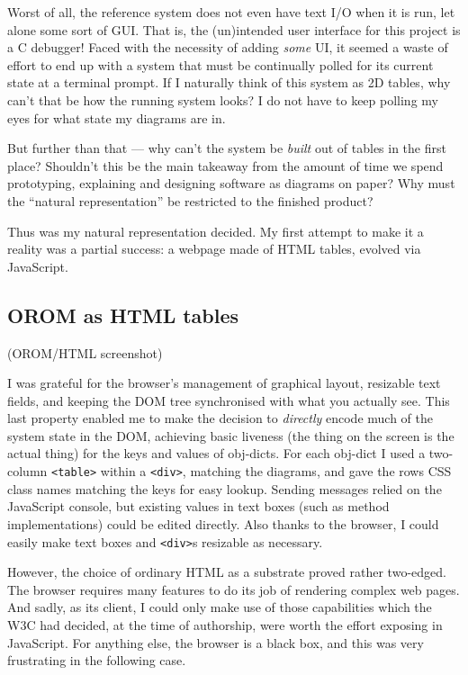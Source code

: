 \documentclass[english,submission]{programming}
\begin{document}
  Worst of all, the reference system does not even have text I/O when it
  is run, let alone some sort of GUI. That is, the (un)intended user
  interface for this project is a C debugger! Faced with the necessity of
  adding \emph{some} UI, it seemed a waste of effort to end up with a
  system that must be continually polled for its current state at a
  terminal prompt. If I naturally think of this system as 2D tables, why
  can't that be how the running system looks? I do not have to keep
  polling my eyes for what state my diagrams are in.

  But further than that --- why can't the system be \emph{built} out of
  tables in the first place? Shouldn't this be the main takeaway from the
  amount of time we spend prototyping, explaining and designing software
  as diagrams on paper? Why must the ``natural representation'' be
  restricted to the finished product?

  Thus was my natural representation decided. My first attempt to make it
  a reality was a partial success: a webpage made of HTML tables, evolved
  via JavaScript.

  \hypertarget{orom-as-html-tables}{%
  \subsection{OROM as HTML tables}\label{orom-as-html-tables}}

  (OROM/HTML screenshot)

  I was grateful for the browser's management of graphical layout,
  resizable text fields, and keeping the DOM tree synchronised with what
  you actually see. This last property enabled me to make the decision to
  \emph{directly} encode much of the system state in the DOM, achieving
  basic liveness (the thing on the screen is the actual thing) for the
  keys and values of obj-dicts. For each obj-dict I used a two-column
  \texttt{\textless{}table\textgreater{}} within a
  \texttt{\textless{}div\textgreater{}}, matching the diagrams, and gave
  the rows CSS class names matching the keys for easy lookup. Sending
  messages relied on the JavaScript console, but existing values in text
  boxes (such as method implementations) could be edited directly. Also
  thanks to the browser, I could easily make text boxes and
  \texttt{\textless{}div\textgreater{}}s resizable as necessary.

  However, the choice of ordinary HTML as a substrate proved rather
  two-edged. The browser requires many features to do its job of rendering
  complex web pages. And sadly, as its client, I could only make use of
  those capabilities which the W3C had decided, at the time of authorship,
  were worth the effort exposing in JavaScript. For anything else, the
  browser is a black box, and this was very frustrating in the following
  case.
\end{document}
